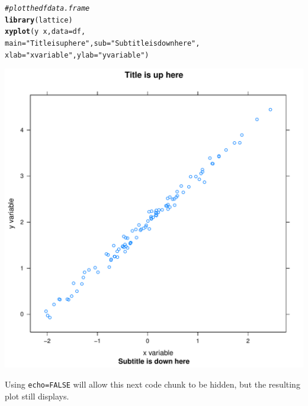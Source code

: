 \documentclass[letterpaper,12pt]{article}\usepackage[]{graphicx}\usepackage[]{color}
\makeatletter
\def\maxwidth{ %
  \ifdim\Gin@nat@width>\linewidth
    \linewidth
  \else
    \Gin@nat@width
  \fi
}
\newcommand{\hlstr}[1]{\textcolor[rgb]{0.192,0.494,0.8}{#1}}%
\newcommand{\hlcom}[1]{\textcolor[rgb]{0.678,0.584,0.686}{\textit{#1}}}%
\newcommand{\hlopt}[1]{\textcolor[rgb]{0,0,0}{#1}}%
\newcommand{\hlstd}[1]{\textcolor[rgb]{0.345,0.345,0.345}{#1}}%
\newcommand{\hlkwc}[1]{\textcolor[rgb]{0.333,0.667,0.333}{#1}}%
\newcommand{\hlkwd}[1]{\textcolor[rgb]{0.737,0.353,0.396}{\textbf{#1}}}%
\newenvironment{kframe}{%
 \def\at@end@of@kframe{}%
 \ifinner\ifhmode%
  \def\at@end@of@kframe{\end{minipage}}%
  \begin{minipage}{\columnwidth}%
 \fi\fi%
 \def\FrameCommand##1{\hskip\@totalleftmargin \hskip-\fboxsep
 \colorbox{shadecolor}{##1}\hskip-\fboxsep
     \hskip-\linewidth \hskip-\@totalleftmargin \hskip\columnwidth}%
 \MakeFramed {\advance\hsize-\width
   \@totalleftmargin\z@ \linewidth\hsize
   \@setminipage}}%
 {\par\unskip\endMakeFramed%
 \at@end@of@kframe}
\newenvironment{knitrout}{}{} %
\makeatother
\begin{document}
\begin{knitrout}
\begin{kframe}
\begin{alltt}
\hlcom{# plot the df data.frame}
\hlkwd{library}\hlstd{(lattice)}
\hlkwd{xyplot}\hlstd{(y} \hlopt{~} \hlstd{x,} \hlkwc{data} \hlstd{= df,}
       \hlkwc{main} \hlstd{=} \hlstr{"Title is up here"}\hlstd{,} \hlkwc{sub}\hlstd{=}\hlstr{"Subtitle is down here"}\hlstd{,}
       \hlkwc{xlab}\hlstd{=}\hlstr{"x variable"}\hlstd{,} \hlkwc{ylab}\hlstd{=}\hlstr{"y variable"}\hlstd{)}
\end{alltt}
\end{kframe}
\includegraphics[width=\maxwidth]{figure/plot_echo-1} 

\end{knitrout}

Using \verb|echo=FALSE| will allow this next code chunk to be hidden,
  but the resulting plot still displays.
\end{document}
